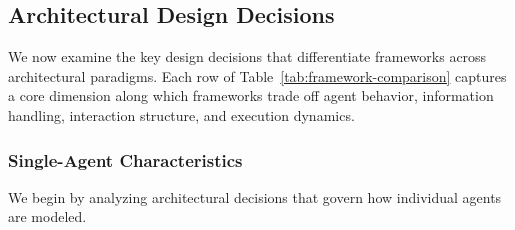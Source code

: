 







\subsection{Architectural Design Decisions}
\label{Architectural_Decisions}

We now examine the key design decisions that differentiate frameworks across architectural paradigms. Each row of Table~\ref{tab:framework-comparison} captures a core dimension along which frameworks trade off agent behavior, information handling, interaction structure, and execution dynamics.

\subsubsection{Single-Agent Characteristics}

We begin by analyzing architectural decisions that govern how individual agents are modeled. 
